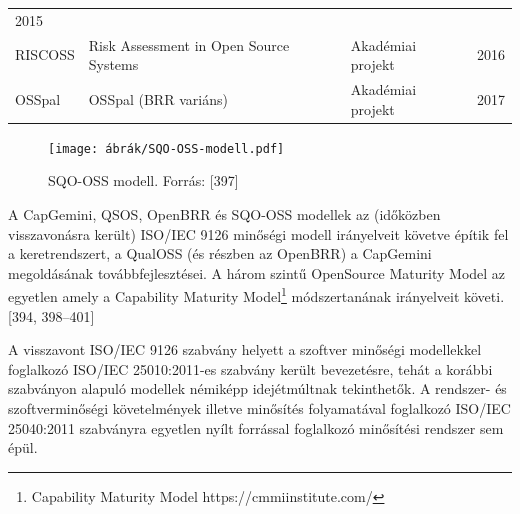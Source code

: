 \documentclass[12pt,magyar,a4paper,oneside]{scrreprt}
\begin{document}
\begin{longtable}[]{@{}llll@{}}
\begin{minipage}[t]{0.04\columnwidth}
2015\strut
\end{minipage}\tabularnewline
\begin{minipage}[t]{0.14\columnwidth}\raggedright
RISCOSS\strut
\end{minipage} & \begin{minipage}[t]{0.49\columnwidth}\raggedright
Risk Assessment in Open Source Systems\strut
\end{minipage} & \begin{minipage}[t]{0.21\columnwidth}\raggedright
Akadémiai projekt\strut
\end{minipage} & \begin{minipage}[t]{0.04\columnwidth}\raggedright
2016\strut
\end{minipage}\tabularnewline
\begin{minipage}[t]{0.14\columnwidth}\raggedright
OSSpal\strut
\end{minipage} & \begin{minipage}[t]{0.49\columnwidth}\raggedright
OSSpal (BRR variáns)\strut
\end{minipage} & \begin{minipage}[t]{0.21\columnwidth}\raggedright
Akadémiai projekt\strut
\end{minipage} & \begin{minipage}[t]{0.04\columnwidth}\raggedright
2017\strut
\end{minipage}\tabularnewline
\bottomrule
\end{longtable}

\begin{figure}
\centering
\texttt{[image: ábrák/SQO-OSS-modell.pdf]}
\caption{SQO-OSS modell. Forrás: {[}397{]}}
\end{figure}

A CapGemini, QSOS, OpenBRR és SQO-OSS modellek az (időközben
visszavonásra került) ISO/IEC 9126 minőségi modell irányelveit követve
építik fel a keretrendszert, a QualOSS (és részben az OpenBRR) a
CapGemini megoldásának továbbfejlesztései. A három szintű OpenSource
Maturity Model az egyetlen amely a Capability Maturity Model\footnote{Capability
  Maturity Model https://cmmiinstitute.com/} módszertanának irányelveit
követi. {[}394, 398--401{]}

A visszavont ISO/IEC 9126 szabvány helyett a szoftver minőségi
modellekkel foglalkozó ISO/IEC 25010:2011-es szabvány került
bevezetésre, tehát a korábbi szabványon alapuló modellek némiképp
idejétmúltnak tekinthetők. A rendszer- és szoftverminőségi követelmények
illetve minősítés folyamatával foglalkozó ISO/IEC 25040:2011 szabványra
egyetlen nyílt forrással foglalkozó minősítési rendszer sem épül.
\end{document}
